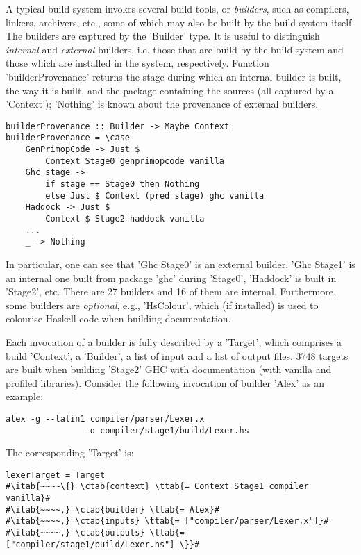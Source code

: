 A typical build system invokes several build tools, or \emph{builders}, such as
compilers, linkers, archivers, etc., some of which may also be built by the
build system itself. The builders are captured by the \lst'Builder' type. It
is useful to distinguish \emph{internal} and \emph{external} builders, i.e.
those that are build by the build system and those which are installed in the
system, respectively. Function \lst'builderProvenance' returns the stage
during which an internal builder is built, the way it is built, and the package
containing the sources (all captured by a \lst'Context'); \lst'Nothing' is
known about the provenance of external builders.

\begin{lstlisting}
builderProvenance :: Builder -> Maybe Context
builderProvenance = \case
    GenPrimopCode -> Just $
        Context Stage0 genprimopcode vanilla
    Ghc stage ->
        if stage == Stage0 then Nothing
        else Just $ Context (pred stage) ghc vanilla
    Haddock -> Just $
        Context $ Stage2 haddock vanilla
    ...
    _ -> Nothing
\end{lstlisting}

In particular, one can see that \lst'Ghc Stage0' is an external builder,
\lst'Ghc Stage1' is an internal one built from package \lst'ghc'
during \lst'Stage0', \lst'Haddock' is built in \lst'Stage2', etc. There are
27 builders and 16 of them are internal. Furthermore, some builders are
\emph{optional}, e.g., \lst'HsColour', which (if installed) is used to
colourise Haskell code when building documentation.

Each invocation of a builder is fully described by a \lst'Target', which
comprises a build \lst'Context', a \lst'Builder', a list of input and
a list of output files. 3748 targets are built when building \lst'Stage2' GHC
with documentation (with vanilla and profiled libraries). Consider the following
invocation of builder \lst'Alex' as an example:

\begin{lstlisting}
alex -g --latin1 compiler/parser/Lexer.x
                -o compiler/stage1/build/Lexer.hs
\end{lstlisting}

\noindent The corresponding \lst'Target' is:

\begin{lstlisting}
lexerTarget = Target
#\itab{~~~~\{} \ctab{context} \ttab{= Context Stage1 compiler vanilla}#
#\itab{~~~~,} \ctab{builder} \ttab{= Alex}#
#\itab{~~~~,} \ctab{inputs} \ttab{= ["compiler/parser/Lexer.x"]}#
#\itab{~~~~,} \ctab{outputs} \ttab{= ["compiler/stage1/build/Lexer.hs"] \}}#
\end{lstlisting}

